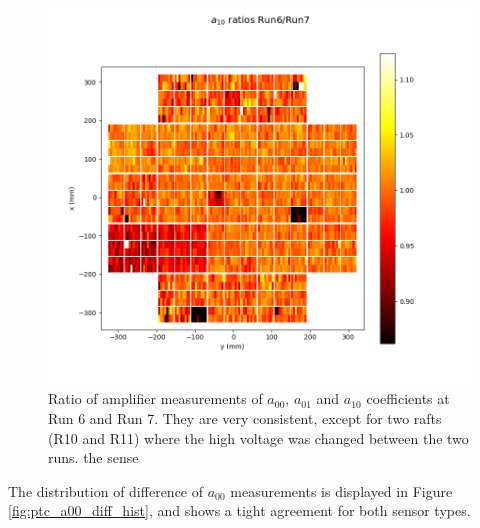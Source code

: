 \begin{figure}[ht]
\begin{centering}
  \includegraphics[width=\linewidth]{figures/baselineCharacterization/a10_ratios.png}
  \endminipage\hfill
  

\caption{Ratio of amplifier measurements of $a_{00}$, $a_{01}$ and $a_{10}$ coefficients at Run 6 and Run 7. They are very consistent, except for two rafts (R10 and R11) where the high voltage was changed between the two runs. the sense \label{fig:ratio_bf_coeff_6_7}}
  \end{centering}
  \end{figure}

The distribution of difference of $a_{00}$ measurements is displayed in Figure \ref{fig:ptc_a00_diff_hist}, and shows a tight agreement for both sensor types.

